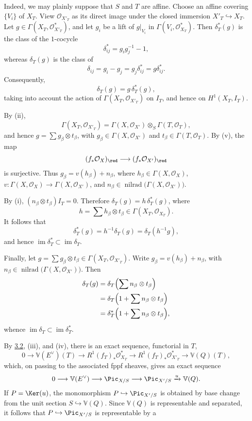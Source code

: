 Indeed, we may plainly suppose that $S$ and $T$ are affine. Choose an affine
covering $\{V_i\}$ of $X_T$. View $\mathcal O_{X'_T}$ as its direct image
under the closed immersion $X'_T\hookrightarrow X_T$. Let
$g\in\Gamma(X_T,\mathcal O_{X'_T}^{*})$, and let $g_i$ be a lift of
$g|_{V_i}$ in $\Gamma(V_i,\mathcal O_{X_T}^{*})$. Then $\delta_T^*(g)$ is
the class of the $1$-cocycle
\[
  \delta_{ij}^*=g_i g_j^{-1}-1,
\]
whereas $\delta_T(g)$ is the class of
\[
  \delta_{ij}=g_i-g_j=g_j\delta_{ij}^*=g\delta_{ij}^*.
\]
Consequently,
\[
  \delta_T(g)=g\,\delta_T^*(g),
\]
taking into account the action of
$\Gamma(X_T,\mathcal O_{X'_T})$ on $I_T$, and hence on $H^1(X_T,I_T)$.

By (ii),
\[
  \Gamma(X_T,\mathcal O_{X'_T})
  =\Gamma(X,\mathcal O_{X'})\otimes_S\Gamma(T,\mathcal O_T),
\]
and hence $g=\sum g_\beta\otimes t_\beta$, with
$g_\beta\in\Gamma(X,\mathcal O_{X'})$ and
$t_\beta\in\Gamma(T,\mathcal O_T)$. By (v), the map
\[
  (f_*\mathcal O_X)_{\red}\longrightarrow
  (f_*\mathcal O_{X'})_{\red}
\]
is surjective. Thus
$g_\beta=v(h_\beta)+n_\beta$, where
$h_\beta\in\Gamma(X,\mathcal O_X)$,
$v:\Gamma(X,\mathcal O_X)\to\Gamma(X,\mathcal O_{X'})$, and
$n_\beta\in\operatorname{nilrad}\bigl(\Gamma(X,\mathcal O_{X'})\bigr)$.

By (i), $(n_\beta\otimes t_\beta)I_T=0$. Therefore
$\delta_T(g)=h\,\delta_T^*(g)$, where
\[
  h=\sum h_\beta\otimes t_\beta
  \in\Gamma(X_T,\mathcal O_{X_T}).
\]
It follows that
\[
  \delta_T^*(g)=h^{-1}\delta_T(g)=\delta_T(h^{-1}g),
\]
and hence $\operatorname{im}\delta_T^*\subset
\operatorname{im}\delta_T$.

Finally, let
$g=\sum g_\beta\otimes t_\beta\in\Gamma(X_T,\mathcal O_{X'_T})$.
Write $g_\beta=v(h_\beta)+n_\beta$, with
$n_\beta\in\operatorname{nilrad}\bigl(\Gamma(X,\mathcal O_{X'})\bigr)$. Then
\[
\begin{split}
  \delta_T(g)
  &=\delta_T\Bigl(\sum n_\beta\otimes t_\beta\Bigr)\\
  &=\delta_T\Bigl(1+\sum n_\beta\otimes t_\beta\Bigr)\\
  &=\delta_T^*\Bigl(1+\sum n_\beta\otimes t_\beta\Bigr),
\end{split}
\]
whence $\operatorname{im}\delta_T\subset
\operatorname{im}\delta_T^*$.

By \hyperlink{sga6.e12.para.3-2}{3.2}, (iii), and (iv), there is an exact sequence, functorial in $T$,
\[
  0\longrightarrow\mathbb V(E^\vee)(T)
  \longrightarrow R^1(f_T)_*\mathcal O_{X_T}^{*}
  \longrightarrow R^1(f_T)_*\mathcal O_{X'_T}^{*}
  \longrightarrow\mathbb V(Q)(T),
\]
which, on passing to the associated fppf sheaves, gives an exact sequence
\[
  0\longrightarrow\mathbb V(E^\vee)\longrightarrow\Pic_{X/S}
  \longrightarrow\Pic_{X'/S}\xrightarrow{u}\mathbb V(Q).
\]
If $P=\Ker(u)$, the monomorphism $P\hookrightarrow\Pic_{X'/S}$ is obtained
by base change from the unit section $S\hookrightarrow\mathbb V(Q)$.
Since $\mathbb V(Q)$ is representable and separated, it follows that
$P\hookrightarrow\Pic_{X'/S}$ is representable by a

